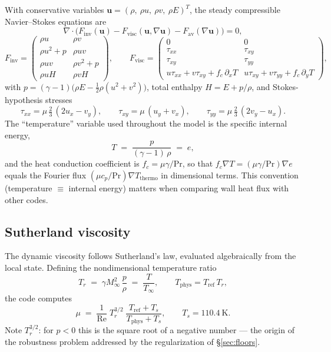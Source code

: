 \documentclass[11pt]{article}
\newcommand{\bu}{\mathbf{u}}
\newcommand{\Minf}{M_\infty}
\newcommand{\Rey}{\mathrm{Re}}
\newcommand{\Pran}{\mathrm{Pr}}
\begin{document}
With conservative variables
$\bu = (\rho,\ \rho u,\ \rho v,\ \rho E)^{T}$, the steady compressible
Navier--Stokes equations are
\begin{equation}
\nabla\cdot\bigl(F_{\mathrm{inv}}(\bu) - F_{\mathrm{visc}}(\bu,\nabla\bu)
- F_{\mathrm{av}}(\nabla\bu)\bigr) = 0 ,
\label{eq:ns}
\end{equation}
\begin{equation}
F_{\mathrm{inv}} =
\begin{pmatrix}
\rho u & \rho v\\
\rho u^2 + p & \rho u v\\
\rho u v & \rho v^2 + p\\
\rho u H & \rho v H
\end{pmatrix},
\qquad
F_{\mathrm{visc}} =
\begin{pmatrix}
0 & 0\\
\tau_{xx} & \tau_{xy}\\
\tau_{xy} & \tau_{yy}\\
u\tau_{xx}+v\tau_{xy}+f_c\,\partial_x T &
u\tau_{xy}+v\tau_{yy}+f_c\,\partial_y T
\end{pmatrix},
\end{equation}
with $p = (\gamma-1)\bigl(\rho E - \tfrac12\rho(u^2+v^2)\bigr)$, total
enthalpy $H = E + p/\rho$, and Stokes-hypothesis stresses
\begin{equation}
\tau_{xx} = \mu\,\tfrac23\,(2u_x - v_y),\qquad
\tau_{xy} = \mu\,(u_y + v_x),\qquad
\tau_{yy} = \mu\,\tfrac23\,(2v_y - u_x).
\end{equation}
The ``temperature'' variable used throughout the model is the specific
internal energy,
\begin{equation}
T \;=\; \frac{p}{(\gamma-1)\,\rho} \;=\; e,
\end{equation}
and the heat conduction coefficient is $f_c = \mu\gamma/\Pran$, so that
$f_c \nabla T = (\mu\gamma/\Pran)\nabla e$ equals the Fourier flux
$ (\mu c_p / \Pran) \nabla T_{\mathrm{thermo}}$ in dimensional terms. This
convention (temperature $\equiv$ internal energy) matters when comparing wall
heat flux with other codes.

\subsection{Sutherland viscosity}

The dynamic viscosity follows Sutherland's law, evaluated algebraically from
the local state. Defining the nondimensional temperature ratio
\begin{equation}
T_r \;=\; \gamma \Minf^2\, \frac{p}{\rho}
\;=\; \frac{T}{T_\infty},
\qquad T_{\mathrm{phys}} = T_{\mathrm{ref}}\, T_r,
\end{equation}
the code computes
\begin{equation}
\mu \;=\; \frac{1}{\Rey}\; T_r^{3/2}\;
\frac{T_{\mathrm{ref}} + T_s}{T_{\mathrm{phys}} + T_s},
\qquad T_s = 110.4~\mathrm{K}.
\label{eq:sutherland}
\end{equation}
Note $T_r^{3/2}$: for $p<0$ this is the square root of a negative number ---
the origin of the robustness problem addressed by the regularization of
\S\ref{sec:floors}.
\end{document}
